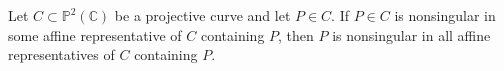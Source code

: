Let $C \subset \mathbb{P}^2(\mathbb{C})$ be a projective curve and let $P \in C$. If $P \in C$ is nonsingular in some affine representative of $C$ containing $P$, then $P$ is nonsingular in all affine representatives of $C$ containing $P$.
